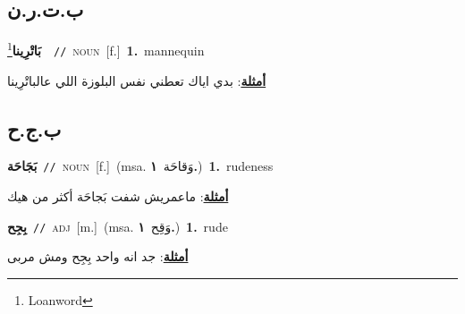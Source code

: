 \documentclass[10pt,a4paper,twoside]{article} %
\begin{document}
\begin{multicols}{2}
{{{\vspace{-3mm}
\subsection*{\color{blue}\foreignlanguage{arabic}{ب.ت.ر.ن}\color{blue}{ (ntws)}} 

{\setlength\topsep{0pt}\textbf{\foreignlanguage{arabic}{بَاتْرِينا}}\footnote{Loanword}\ \ {\color{gray}\texttt{//}\color{black}}\ \textsc{noun}\ [f.]\ \textbf{1.}~mannequin\  \begin{flushright}\color{gray}\foreignlanguage{arabic}{\textbf{\underline{\foreignlanguage{arabic}{أمثلة}}}: بدي اياك تعطني نفس البلوزة اللي عالباتْرِينا}\end{flushright}\color{black}} \vspace{2mm}

\vspace{-3mm}
\subsection*{\color{blue}\foreignlanguage{arabic}{ب.ج.ح}\color{blue}{}} 

{\setlength\topsep{0pt}\textbf{\foreignlanguage{arabic}{بَجَاحَة}}\ {\color{gray}\texttt{//}\color{black}}\ \textsc{noun}\ [f.]\ \color{gray}(msa. \foreignlanguage{arabic}{وَقاحَة}~\foreignlanguage{arabic}{\textbf{١.}})\color{black}\ \textbf{1.}~rudeness\  \begin{flushright}\color{gray}\foreignlanguage{arabic}{\textbf{\underline{\foreignlanguage{arabic}{أمثلة}}}: ماعمريش شفت بَجاحَة أكثر من هيك}\end{flushright}\color{black}} \vspace{2mm}

{\setlength\topsep{0pt}\textbf{\foreignlanguage{arabic}{بِجِح}}\ {\color{gray}\texttt{//}\color{black}}\ \textsc{adj}\ [m.]\ \color{gray}(msa. \foreignlanguage{arabic}{وَقِح}~\foreignlanguage{arabic}{\textbf{١.}})\color{black}\ \textbf{1.}~rude\  \begin{flushright}\color{gray}\foreignlanguage{arabic}{\textbf{\underline{\foreignlanguage{arabic}{أمثلة}}}: جد انه واحد بِجِح ومش مربى}\end{flushright}\color{black}} \vspace{2mm}

}}}
\end{multicols}
\end{document}
